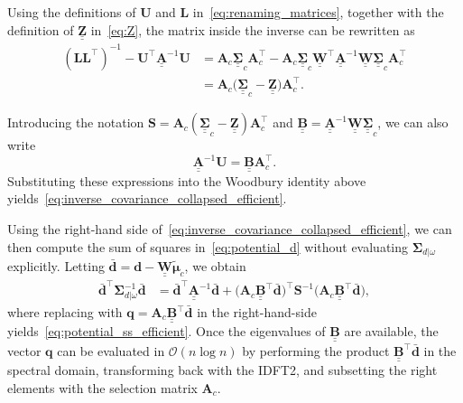 \documentclass[12pt]{article}
\newcommand{\mybcirc}[1] {\underline{\underline{\bm{#1}}}}
\begin{document}
Using the definitions of $\bm{U}$ and $\bm{L}$ in~\eqref{eq:renaming_matrices}, together with the definition of $\mybcirc{Z}$ in~\eqref{eq:Z}, the matrix inside the inverse can be rewritten as
\begin{equation}
\begin{split}
    (\bm{L}\bm{L}^{\top})^{-1}
    -
    \bm{U}^{\top}\mybcirc{A}^{-1}\bm{U}
    &=
    \bm{A}_c \mybcirc{\Sigma}_{c} \bm{A}_c^{\top}
    -
    \bm{A}_c \mybcirc{\Sigma}_{c} \mybcirc{W}^{\top}
    \mybcirc{A}^{-1} \mybcirc{W} \mybcirc{\Sigma}_{c} \bm{A}_c^{\top} \\
    &=
    \bm{A}_c \bigl(\mybcirc{\Sigma}_{c} - \mybcirc{Z}\bigr) \bm{A}_c^{\top}.
\end{split}
\end{equation}

Introducing the notation $\bm{S} = \bm{A}_c (\mybcirc{\Sigma}_{c} - \mybcirc{Z}) \bm{A}_c^{\top}$ and $\mybcirc{B} = \mybcirc{A}^{-1}\mybcirc{W}\mybcirc{\Sigma}_c$, we can also write
\begin{equation}
    \mybcirc{A}^{-1}\bm{U}
    =
    \mybcirc{B}\bm{A}_c^{\top}.
\end{equation}
Substituting these expressions into the Woodbury identity above yields~\eqref{eq:inverse_covariance_collapsed_efficient}.

Using the right-hand side of~\eqref{eq:inverse_covariance_collapsed_efficient}, we can then compute the sum of squares in~\eqref{eq:potential_d} without evaluating $\bm{\Sigma}_{d|\omega}$ explicitly. Letting $\bar{\bm{d}} = \bm{d} - \mybcirc{W}\tilde{\bm{\mu}}_c$, we obtain
\begin{equation}\label{eq:dt_sigmadwinv_d}
\begin{split}
    \bar{\bm{d}}^{\top} \bm{\Sigma}_{d|\omega}^{-1} \bar{\bm{d}}
    &=
    \bar{\bm{d}}^{\top} \mybcirc{A}^{-1} \bar{\bm{d}}
    +
    \bigl(\bm{A}_c \mybcirc{B}^{\top} \bar{\bm{d}}\bigr)^{\top}
    \bm{S}^{-1}
    \bigl(\bm{A}_c \mybcirc{B}^{\top} \bar{\bm{d}}\bigr),
\end{split}
\end{equation}
where replacing with $\bm{q} = \bm{A}_c \mybcirc{B}^{\top} \bar{\bm{d}}$ in the right-hand-side yields~\eqref{eq:potential_ss_efficient}. Once the eigenvalues of $\mybcirc{B}$ are available, the vector $\bm{q}$ can be evaluated in $\mathcal{O}(n \log n)$ by performing the product $\mybcirc{B}^{\top} \bar{\bm{d}}$ in the spectral domain, transforming back with the IDFT2, and subsetting the right elements with the selection matrix $\bm{A}_c$.
\end{document}
